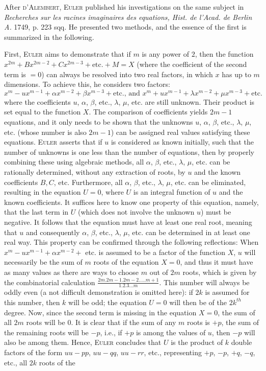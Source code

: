 \documentclass[12pt]{memoir}
\theoremstyle{plain}
\theoremstyle{remark}
\begin{document}
After \textsc{d'Alembert}, \textsc{Euler} published his investigations on the same subject in \textit{Recherches sur les racines imaginaires des equations, Hist. de l'Acad. de Berlin A.} 1749, p. 223 sqq. He presented two methods, and the essence of the first is summarized in the following.

First, \textsc{Euler} aims to demonstrate that if \(m\) is any power of \(2\), then the function \(x^{2m} + Bx^{2m-2} + C x^{2m-3} + \text{etc.} + M = X\) (where the coefficient of the second term is \(= 0\)) can always be resolved into two real factors, in which \(x\) has up to \(m\) dimensions. To achieve this, he considers two factors: \[x^m - u x^{m-1} + \alpha x^{m-2} + \beta x^{m-3} + \text{etc., and } x^m + u x^{m-1}+\lambda x^{m-2} + \mu x^{m-3} + \text{etc.}\] where the coefficients \(u\), \(\alpha\), \(\beta\), etc., \(\lambda\), \(\mu\), etc. are still unknown. Their product is set equal to the function \(X\). The comparison of coefficients yields \(2m-1\) equations, and it only needs to be shown that the unknowns \(u\), \(\alpha\), \(\beta\), etc., \(\lambda\), \(\mu\), etc. (whose number is also \(2m -1\)) can be assigned real values satisfying these equations. \textsc{Euler} asserts that if \(u\) is considered as known initially, such that the number of unknowns is one less than the number of equations, then by properly combining these using algebraic methods, all \(\alpha\), \(\beta\), etc., \(\lambda\), \(\mu\), etc. can be rationally determined, without any extraction of roots, by \(u\) and the known coefficients \(B, C\), etc. Furthermore, all \(\alpha\), \(\beta\), etc., \(\lambda\), \(\mu\), etc. can be eliminated, resulting in the equation \(U = 0\), where \(U\) is an integral function of \(u\) and the known coefficients. It suffices here to know one property of this equation, namely, that the last term in \(U\) (which does not involve the unknown \(u\)) must be negative. It follows that the equation must have at least one real root, meaning that \(u\) and consequently \(\alpha\), \(\beta\), etc., \(\lambda\), \(\mu\), etc. can be determined in at least one real way. This property can be confirmed through the following reflections: When \(x^m - u x^{m-1}+\alpha x^{m-2} +\) etc. is assumed to be a factor of the function \(X\), \(u\) will necessarily be the sum of \(m\) roots of the equation \(X = 0\), and thus it must have as many values as there are ways to choose \(m\) out of \(2m\) roots, which is given by the combinatorial calculation \(\frac{2m . 2m-1 . 2m-2 . \dots . m+1}{1.2.3 \dots m}\). This number will always be oddly even (a not difficult demonstration is omitted here): if \(2k\) is assumed for this number, then \(k\) will be odd; the equation \(U = 0\) will then be of the \(2k^{th}\) degree. Now, since the second term is missing in the equation \(X = 0\), the sum of all \(2m\) roots will be \(0\). It is clear that if the sum of any \(m\) roots is \(+p\), the sum of the remaining roots will be \(-p\), i.e., if \(+p\) is among the values of \(u\), then \(-p\) will also be among them. Hence, \textsc{Euler} concludes that \(U\) is the product of \(k\) double factors of the form \(uu - pp\), \(uu - qq\), \(uu - rr\), etc., representing \(+p\), \(-p\), \(+q\), \(-q\), etc., all \(2k\) roots of the 
\end{document}
